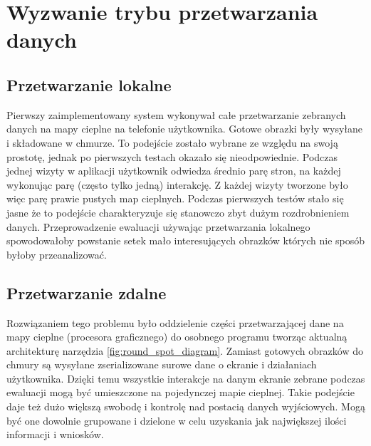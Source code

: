 \section{Wyzwanie trybu przetwarzania danych}

\subsection{Przetwarzanie lokalne}
Pierwszy zaimplementowany system wykonywał całe przetwarzanie zebranych danych na mapy cieplne na telefonie użytkownika. Gotowe obrazki były wysyłane i składowane w chmurze. To podejście zostało wybrane ze względu na swoją prostotę, jednak po pierwszych testach okazało się nieodpowiednie. Podczas jednej wizyty w aplikacji  użytkownik odwiedza średnio parę stron, na każdej wykonując parę (często tylko jedną) interakcję. Z każdej wizyty tworzone było więc parę prawie pustych map cieplnych. Podczas pierwszych testów stało się jasne że to podejście charakteryzuje się stanowczo zbyt dużym rozdrobnieniem danych. Przeprowadzenie ewaluacji używając przetwarzania lokalnego spowodowałoby powstanie setek mało interesujących obrazków których nie sposób byłoby przeanalizować.

\subsection{Przetwarzanie zdalne}
Rozwiązaniem tego problemu było oddzielenie części przetwarzającej dane na mapy cieplne (procesora graficznego) do osobnego programu tworząc aktualną architekturę narzędzia \ref{fig:round_spot_diagram}. Zamiast gotowych obrazków do chmury są wysyłane zserializowane surowe dane o ekranie i działaniach użytkownika. Dzięki temu wszystkie interakcje na danym ekranie zebrane podczas ewaluacji mogą być umieszczone na pojedynczej mapie cieplnej. Takie podejście daje też dużo większą swobodę i kontrolę nad postacią danych wyjściowych. Mogą być one dowolnie grupowane i dzielone w celu uzyskania jak największej ilości informacji i wniosków.
